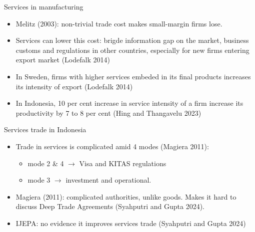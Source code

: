 \documentclass[
  ignorenonframetext,
]{beamer}
\begin{document}
\begin{frame}{Services in manufacturing}
\label{services-in-manufacturing}
\begin{itemize}
\item
  Melitz (2003): non-trivial trade cost makes small-margin firms lose.
\item
  Services can lower this cost: brigde information gap on the market,
  business customs and regulations in other countries, especially for
  new firms entering export market (Lodefalk 2014)
\item
  In Sweden, firms with higher services embeded in its final products
  increases its intensity of export (Lodefalk 2014)
\item
  In Indonesia, 10 per cent increase in service intensity of a firm
  increase its productivity by 7 to 8 per cent (Hing and Thangavelu
  2023)
\end{itemize}
\end{frame}

\begin{frame}{Services trade in Indonesia}
\label{services-trade-in-indonesia}
\begin{itemize}
\item
  Trade in services is complicated amid 4 modes (Magiera 2011):

  \begin{itemize}
  \item
    mode 2 \& 4 \(\rightarrow\) Visa and KITAS regulations
  \item
    mode 3 \(\rightarrow\) investment and operational.
  \end{itemize}
\item
  Magiera (2011): complicated authorities, unlike goods. Makes it hard
  to discuss Deep Trade Agreements (Syahputri and Gupta 2024).
\item
  IJEPA: no evidence it improves services trade (Syahputri and Gupta
  2024)
\end{itemize}
\end{frame}
\end{document}

